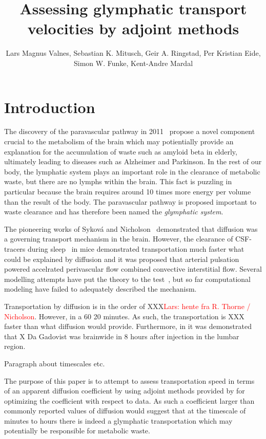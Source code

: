 \documentclass[11pt,a4paper]{article}
\title{Assessing glymphatic transport velocities by adjoint methods}
\author{Lars Magnus Valnes, Sebastian K. Mitusch, Geir A. Ringstad, Per Kristian Eide, Simon W. Funke, Kent-Andre Mardal }
\renewcommand{\comment}[1]{\textcolor{red}{#1}}
\begin{document}
\maketitle

\begin{abstract}
\end{abstract}
\section{Introduction}

The discovery of the paravascular pathway in 2011~\cite{iliff2012paravascular} propose a novel component
crucial to the metabolism of the brain which may potientially provide an explanation for the accumulation of
waste such as amyloid beta in elderly, ultimately leading to diseases such as Alzheimer and Parkinson. 
In the rest of our body, the lymphatic system plays an important role
in the clearance of metabolic waste, but there are no lymphs within the brain. This fact is puzzling in particular because
the brain requires around 10 times more energy per volume than the result of the body. The paravascular 
pathway is proposed important to waste clearance and has therefore been named the \emph{glymphatic system}.      

The pioneering works of Sykov{\'a} and Nicholson~\cite{sykova2008diffusion} demonstrated
that diffusion was a governing transport mechanism in the brain. However, 
the clearance of CSF-tracers during sleep~\cite{xie2013sleep} in mice demonstrated transportation
much faster what could be explained by diffusion and it was proposed that arterial pulsation powered
accelrated perivascular flow combined convective interstitial flow. Several modelling attempts
have put the theory to the test~\cite{asgari2016glymphatic, smith2017glymphatic, holter2017interstitial}, 
but so far computational modeling have failed to adequately described the mechanism.   

Transportation by diffusion is in the order of XXX\comment{Lars: hente fra R. Thorne / Nicholson}. 
However, in \cite{xie2013sleep} a 60%
20 minutes. As such, the transportation is XXX faster than what diffusion would provide. Furthermore, 
in \cite{eidevalnes} it was demonstrated that X Da Gadovist was brainwide in 8 hours after injection in the lumbar region.      

Paragraph about timescales etc. 

The purpose of this paper is to attempt to assess transportation speed in terms of an apparent diffusion coefficient 
by using adjoint methods provided by \cite{} for optimizing the coefficient with respect to data. As
such a coefficient larger than commonly reported values of diffusion would suggest that at the
timescale of minutes to hours there is indeed a glymphatic transportation which may potentially 
be responsible for metabolic waste.     
\end{document}
